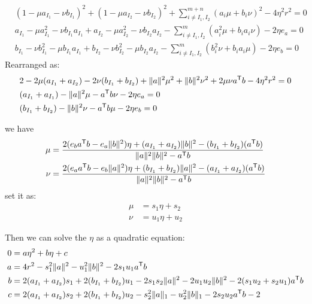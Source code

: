 \begin{equation}
\begin{split} 
 & (1-\mu a_{I_1}-\nu b_{I_1})^2 + (1-\mu a_{I_2}-\nu b_{I_2})^2 + \sum^{m+n}_{i\neq I_1,I_2}(a_i\mu+b_i\nu)^2 - 4\eta^2 r^2 = 0 \\
 & a_{I_1}-\mu a_{I_1}^2-\nu b_{I_1}a_{I_1} + a_{I_2}-\mu a_{I_2}^2-\nu b_{I_2}a_{I_2} - \sum^{m}_{i\neq I_1,I_2}(a_i^2\mu +b_i a_i\nu) - 2\eta {e_a} = 0 \\
 & b_{I_1}-\nu b_{I_1}^2-\mu b_{I_1}a_{I_1} + b_{I_2}-\nu b_{I_2}^2-\mu b_{I_2}a_{I_2} - \sum^{m}_{i\neq I_1,I_2}(b_i^2\nu +b_i a_i\mu) - 2\eta {e_b} = 0 
 \end{split}
\end{equation}
Rearranged as:
\begin{equation}
\begin{split} 
 & 2-2\mu (a_{I_1}+a_{I_2})-2\nu(b_{I_1}+b_{I_2})+ \|a\|^2\mu^2+\|b\|^2\nu^2+2\mu\nu a^{\mathsf T}b - 4\eta^2 r^2 = 0 \\
 & (a_{I_1}+ a_{I_1}) - \|a\|^2\mu - a^{\mathsf T}b\nu - 2\eta {e_a} = 0 \\
 & (b_{I_1}+ b_{I_2}) - \|b\|^2\nu - a^{\mathsf T}b \mu - 2\eta {e_b} = 0 
 \end{split}
\end{equation}

we have 
\begin{equation}
\begin{split} 
\mu &= \frac{2( e_ba^{\mathsf T}b - e_a\|b\|^2 )\eta + (a_{I_1}+a_{I_2}) \|b\|^2 - (b_{I_1} + b_{I_2}) (a^{\mathsf T}b)}{ \|a\|^2 \|b\|^2 -a^{\mathsf T}b}\\
\nu &=\frac{2( e_aa^{\mathsf T}b - e_b\|a\|^2 )\eta + (b_{I_1}+b_{I_2}) \|a\|^2 - (a_{I_1} + a_{I_2}) (a^{\mathsf T}b)}{ \|a\|^2 \|b\|^2 -a^{\mathsf T}b}\\
 \end{split}
\end{equation}
set it as:
\begin{equation}
\begin{split} 
\mu &= s_1 \eta + s_2\\ 
\nu &= u_1 \eta + u_2
 \end{split}
 \label{eq:final}
\end{equation}

Then we can solve the $\eta$ as a quadratic equation:
\begin{equation}
\begin{split} 
0&=a\eta^2+b\eta+c\\
 a&= 4r^2 - s_1^2\|a\|^2 - u_1^2\|b\|^2 -2s_1 u_1a^{\mathsf T}b\\
b&=2(a_{I_1} + a_{I_2})s_1 +2(b_{I_1} + b_{I_2})u_1 - 2s_1s_2 \|a\|^2 - 2u_1u_2\|b\|^2 - 2(s_1u_2+s_2u_1)a^{\mathsf T}b \\
 c&=2(a_{I_1} + a_{I_2})s_2 +2(b_{I_1} + b_{I_2})u_2 -s_2^2\|a\|_1 -u_2^2\|b\|_1 - 2s_2u_2a^{\mathsf T}b -2
 \end{split}
\end{equation}

